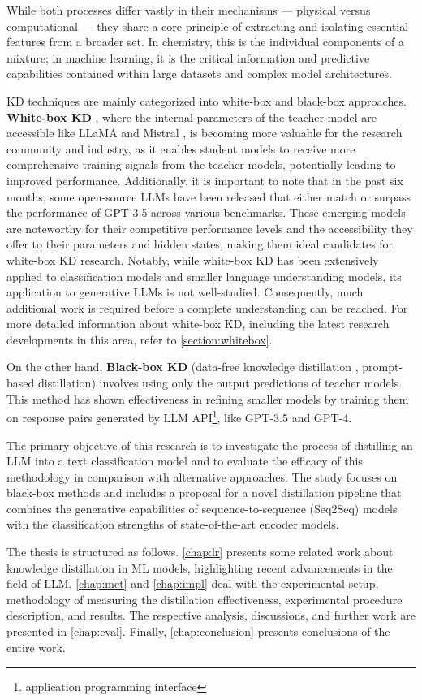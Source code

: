 While both processes differ vastly in their mechanisms — physical versus computational — they share a core principle of extracting and isolating essential features from a broader set. In chemistry, this is the individual components of a mixture; in machine learning, it is the critical information and predictive capabilities contained within large datasets and complex model architectures.

KD techniques are mainly categorized into white-box and black-box approaches. \textbf{White-box KD} \cite{distilling}, where the internal parameters of the teacher model are accessible like LLaMA \cite{llama,llama2} and Mistral \cite{mistral}, is becoming more valuable for the research community and industry, as it enables student models to receive more comprehensive training signals from the teacher models, potentially leading to improved performance. Additionally, it is important to note that in the past six months, some open-source LLMs have been released that either match or surpass the performance of GPT-3.5 across various benchmarks. These emerging models are noteworthy for their competitive performance levels and the accessibility they offer to their parameters and hidden states, making them ideal candidates for white-box KD research. Notably, while white-box KD has been extensively applied to classification models and smaller language understanding models, its application to generative LLMs is not well-studied. Consequently, much additional work is required before a complete understanding can be reached. For more detailed information about white-box KD, including the latest research developments in this area, refer to \autoref{section:whitebox}.

On the other hand, \textbf{Black-box KD} (data-free knowledge distillation \cite{dfkd}, prompt-based distillation) involves using only the output predictions of teacher models. This method has shown effectiveness in refining smaller models by training them on response pairs generated by LLM API\footnote{application programming interface}, like GPT-3.5 and GPT-4.

The primary objective of this research is to investigate the process of distilling an LLM into a text classification model and to evaluate the efficacy of this methodology in comparison with alternative approaches. The study focuses on black-box methods and includes a proposal for a novel distillation pipeline that combines the generative capabilities of sequence-to-sequence (Seq2Seq) models with the classification strengths of state-of-the-art encoder models.

The thesis is structured as follows. \autoref{chap:lr} presents some related work about knowledge distillation in ML models, highlighting recent advancements in the field of LLM\@. \autoref{chap:met} and \autoref{chap:impl} deal with the experimental setup, methodology of measuring the distillation effectiveness, experimental procedure description, and results. The respective analysis, discussions, and further work are presented in \autoref{chap:eval}. Finally, \autoref{chap:conclusion} presents conclusions of the entire work.

